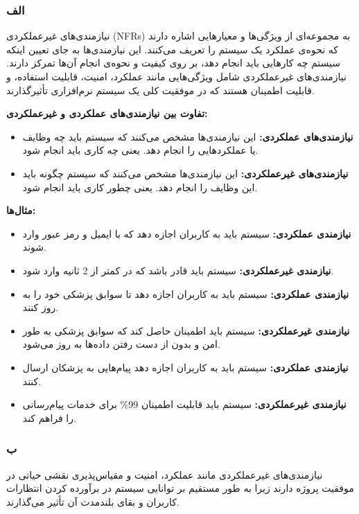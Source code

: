 
\subsubsection*{الف}


نیازمندی‌های غیرعملکردی (NFRs) به مجموعه‌ای از ویژگی‌ها و معیارهایی اشاره دارند که نحوه‌ی عملکرد یک سیستم را تعریف می‌کنند. این نیازمندی‌ها به جای تعیین اینکه سیستم چه کارهایی باید انجام دهد، بر روی کیفیت و نحوه‌ی انجام آن‌ها تمرکز دارند. نیازمندی‌های غیرعملکردی شامل ویژگی‌هایی مانند عملکرد، امنیت، قابلیت استفاده، و قابلیت اطمینان هستند که در موفقیت کلی یک سیستم نرم‌افزاری تأثیرگذارند.

\textbf{تفاوت بین نیازمندی‌های عملکردی و غیرعملکردی:}
\begin{itemize}
    \item \textbf{نیازمندی‌های عملکردی:} این نیازمندی‌ها مشخص می‌کنند که سیستم باید چه وظایف یا عملکردهایی را انجام دهد. یعنی چه کاری باید انجام شود.
    \item \textbf{نیازمندی‌های غیرعملکردی:} این نیازمندی‌ها مشخص می‌کنند که سیستم چگونه باید این وظایف را انجام دهد. یعنی چطور کاری باید انجام شود.
\end{itemize}

\textbf{مثال‌ها:}
\begin{itemize}
    \item \textbf{نیازمندی عملکردی:} سیستم باید به کاربران اجازه دهد که با ایمیل و رمز عبور وارد شوند.
    \item \textbf{نیازمندی غیرعملکردی:} سیستم باید قادر باشد که در کمتر از 2 ثانیه وارد شود.
    \item \textbf{نیازمندی عملکردی:} سیستم باید به کاربران اجازه دهد تا سوابق پزشکی خود را به روز کنند.
    \item \textbf{نیازمندی غیرعملکردی:} سیستم باید اطمینان حاصل کند که سوابق پزشکی به طور امن و بدون از دست رفتن داده‌ها به روز می‌شود.
    \item \textbf{نیازمندی عملکردی:} سیستم باید به کاربران اجازه دهد پیام‌هایی به پزشکان ارسال کنند.
    \item \textbf{نیازمندی غیرعملکردی:} سیستم باید قابلیت اطمینان 99\% برای خدمات پیام‌رسانی را فراهم کند.
\end{itemize}


\subsubsection*{ب}


نیازمندی‌های غیرعملکردی مانند عملکرد، امنیت و مقیاس‌پذیری نقشی حیاتی در موفقیت پروژه دارند زیرا به طور مستقیم بر توانایی سیستم در برآورده کردن انتظارات کاربران و بقای بلندمدت آن تأثیر می‌گذارند.

